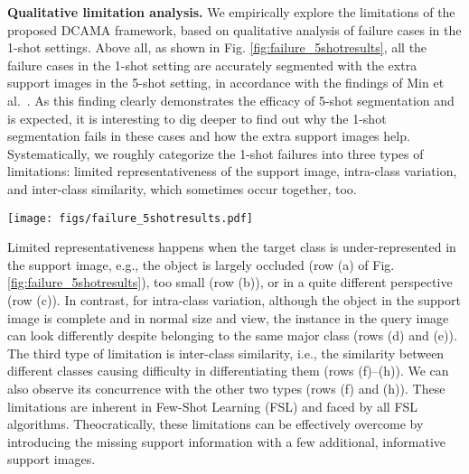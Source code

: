 \documentclass[runningheads,table,xcdraw]{llncs}
\begin{document}
\textbf{Qualitative limitation analysis.}
We empirically explore the limitations of the proposed DCAMA framework, based on qualitative analysis of failure cases in the 1-shot settings.
Above all, as shown in Fig. \ref{fig:failure_5shotresults}, all the failure cases in the 1-shot setting are accurately segmented with the extra support images in the 5-shot setting, in accordance with the findings of Min et al.~\cite{min2021hypercorrelation}.
As this finding clearly demonstrates the efficacy of 5-shot segmentation and is expected, it is interesting to dig deeper to find out why the 1-shot segmentation fails in these cases and how the extra support images help.
Systematically, we roughly categorize the 1-shot failures into three types of limitations: limited representativeness of the support image, intra-class variation, and inter-class similarity, which sometimes occur together, too.

\begin{figure*}[!t]
  \centering
  \texttt{[image: figs/failure\_5shotresults.pdf]}
  \caption{Left: some representative failure cases on PASCAL-5 in 1-shot setting.
  Right: the same cases in 5-shot setting, where the extra support images and masks help our DCAMA framework produce accurate segmentation of the query images in these challenging cases.}
  \label{fig:failure_5shotresults}
\end{figure*}

Limited representativeness happens when the target class is under-represented in the support image, e.g., the object is largely occluded (row (a) of Fig. \ref{fig:failure_5shotresults}), too small (row (b)), or in a quite different perspective (row (c)).
In contrast, for intra-class variation, although the object in the support image is complete and in normal size and view, the instance in the query image can look differently despite belonging to the same major class (rows (d) and (e)).
The third type of limitation is inter-class similarity, i.e., the similarity between different classes causing difficulty in differentiating them (rows (f)--(h)).
We can also observe its concurrence with the other two types (rows (f) and (h)).
These limitations are inherent in Few-Shot Learning (FSL) and faced by all FSL algorithms.
Theocratically, these limitations can be effectively overcome by introducing the missing support information with a few additional, informative support images.
\end{document}
